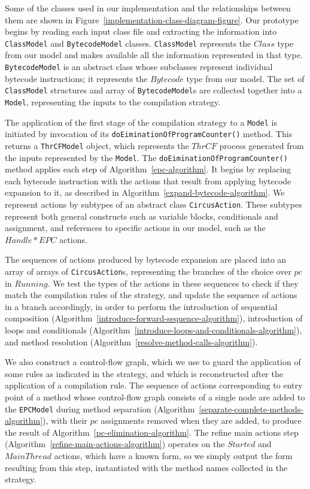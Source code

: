 Some of the classes used in our implementation and the relationships
between them are shown in
Figure~\ref{implementation-class-diagram-figure}. 
Our prototype begins by reading each input class file and extracting
the information into \texttt{ClassModel} and
\texttt{BytecodeModel} classes.
\texttt{ClassModel} represents the $Class$ type from our model and
makes available all the information represented in that type.
\texttt{BytecodeModel} is an abstract class whose subclasses represent
individual bytecode instructions; it represents the $Bytecode$ type
from our model.
The set of \texttt{ClassModel} structures and array of
\texttt{BytecodeModel}s are collected together into a \texttt{Model},
representing the inputs to the compilation strategy.

The application of the first stage of the compilation strategy to a
\texttt{Model} is initiated by invocation of its
\texttt{doEiminationOfProgramCounter()} method.
This returns a \texttt{ThrCFModel} object, which represents the
$ThrCF$ process generated from the inputs represented by the
\texttt{Model}.
The \texttt{doEiminationOfProgramCounter()} method applies each step
of Algorithm~\ref{epc-algorithm}.
It begins by replacing each bytecode instruction with the \Circus{}
actions that result from applying bytecode expansion to it, as
described in Algorithm~\ref{expand-bytecode-algorithm}.
We represent \Circus{} actions by subtypes of an abstract class
\texttt{CircusAction}.
These subtypes represent both general \Circus{} constructs such as
variable blocks, conditionals and assignment, and references to
specific actions in our model, such as the $Handle{*}EPC$ actions.

The sequences of actions produced by bytecode expansion are placed
into an array of arrays of \texttt{CircusAction}s, representing the
branches of the choice over $pc$ in $Running$.
We test the types of the actions in these sequences to check if they
match the compilation rules of the strategy, and update the sequence
of actions in a branch accordingly, in order to perform the
introduction of sequential composition
(Algorithm~\ref{introduce-forward-sequence-algorithm}), introduction
of loops and conditionals
(Algorithm~\ref{introduce-loops-and-conditionals-algorithm}), and
method resolution (Algorithm~\ref{resolve-method-calls-algorithm}).

We also construct a control-flow graph, which we use to guard the
application of some rules as indicated in the strategy, and which is
reconstructed after the application of a compilation rule.
The sequence of actions corresponding to entry point of a method whose
control-flow graph consists of a single node are added to the
\texttt{EPCModel} during method separation
(Algorithm~\ref{separate-complete-methods-algorithm}), with their $pc$
assignments removed when they are added, to produce the result of
Algorithm~\ref{pc-elimination-algorithm}.
The refine main actions step
(Algorithm~\ref{refine-main-actions-algorithm}) operates on the
$Started$ and $MainThread$ actions, which have a known form, so we
simply output the form resulting from this step, instantiated with the
method names collected in the strategy.

